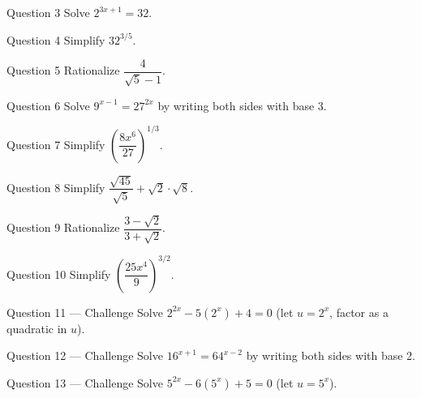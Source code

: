 \documentclass[11pt]{article}
\begin{document}
\begin{qbox}{Question 3}
Solve $2^{3x+1}=32$.\workspace{2.4cm}
\end{qbox}

\begin{qbox}{Question 4}
Simplify $32^{3/5}$.\workspace{2.4cm}
\end{qbox}

\begin{qbox}{Question 5}
Rationalize $\dfrac{4}{\sqrt5-1}$.\workspace{2.4cm}
\end{qbox}

\begin{qbox}{Question 6}
Solve $9^{x-1}=27^{2x}$ by writing both sides with base 3.\workspace{2.4cm}
\end{qbox}

\begin{qbox}{Question 7}
Simplify $\left(\dfrac{8x^6}{27}\right)^{1/3}$.\workspace{2.4cm}
\end{qbox}

\begin{qbox}{Question 8}
Simplify $\dfrac{\sqrt{45}}{\sqrt5}+\sqrt{2}\cdot\sqrt{8}$.\workspace{2.4cm}
\end{qbox}

\begin{qbox}{Question 9}
Rationalize $\dfrac{3-\sqrt2}{3+\sqrt2}$.\workspace{2.4cm}
\end{qbox}

\begin{qbox}{Question 10}
Simplify $\left(\dfrac{25x^4}{9}\right)^{3/2}$.\workspace{2.4cm}
\end{qbox}

\begin{qbox}{Question 11 --- Challenge}
Solve $2^{2x}-5(2^x)+4=0$ (let $u=2^x$, factor as a quadratic in $u$).\workspace{3.6cm}
\end{qbox}

\begin{qbox}{Question 12 --- Challenge}
Solve $16^{x+1}=64^{x-2}$ by writing both sides with base 2.\workspace{3.2cm}
\end{qbox}

\begin{qbox}{Question 13 --- Challenge}
Solve $5^{2x}-6(5^x)+5=0$ (let $u=5^x$).\workspace{3.4cm}
\end{qbox}

\clearpage
{}
\end{document}

